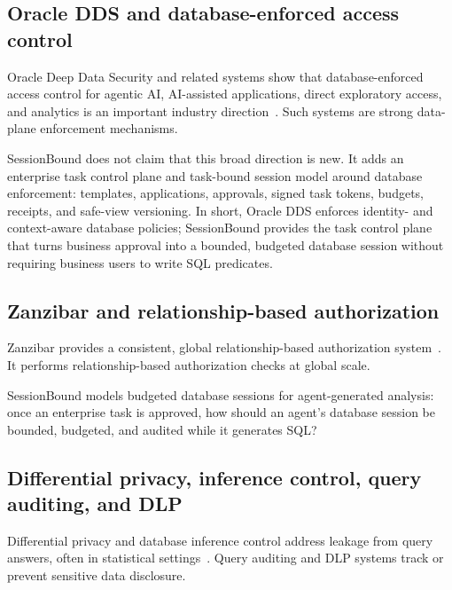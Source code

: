 \documentclass[
]{article}
\newcounter{algorithm}
\begin{document}
\hypertarget{oracle-dds-and-database-enforced-access-control}{%
\subsection{Oracle DDS and database-enforced access
control}\label{oracle-dds-and-database-enforced-access-control}}

Oracle Deep Data Security and related systems show that
database-enforced access control for agentic AI, AI-assisted
applications, direct exploratory access, and analytics is an important
industry direction~\cite{oracle2026deepdatasecuritydocs,oracle2026deepdatasecuritybrief}.
Such systems are strong data-plane enforcement mechanisms.

SessionBound does not claim that this broad direction is new. It adds an
enterprise task control plane and task-bound session model around
database enforcement: templates, applications, approvals, signed task
tokens, budgets, receipts, and safe-view versioning. In short, Oracle
DDS enforces identity- and context-aware database policies; SessionBound
provides the task control plane that turns business approval into a
bounded, budgeted database session without requiring business users to
write SQL predicates.

\hypertarget{zanzibar-and-relationship-based-authorization}{%
\subsection{Zanzibar and relationship-based
authorization}\label{zanzibar-and-relationship-based-authorization}}

Zanzibar provides a consistent, global relationship-based authorization
system~\cite{pang2019zanzibar}. It performs relationship-based
authorization checks at global scale.

SessionBound models budgeted database sessions for agent-generated
analysis: once an enterprise task is approved, how should an agent's
database session be bounded, budgeted, and audited while it generates
SQL?

\hypertarget{differential-privacy-inference-control-query-auditing-and-dlp}{%
\subsection{Differential privacy, inference control, query
auditing, and
DLP}\label{differential-privacy-inference-control-query-auditing-and-dlp}}

Differential privacy and database inference control address leakage from
query answers, often in statistical
settings~\cite{dwork2014algorithmic,adam1989securitycontrol}. Query
auditing and DLP systems track or prevent sensitive data disclosure.
\end{document}
